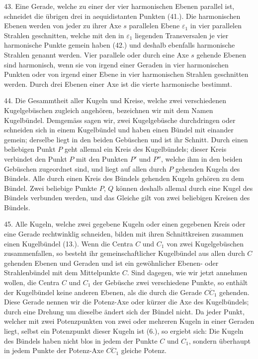 43. Eine Gerade, welche zu einer der vier harmonischen
Ebenen parallel ist, schneidet die \"ubrigen drei in aequidistanten
Punkten (41.). Die harmonischen Ebenen werden
von jeder zu ihrer Axe $s$ parallelen Ebene $\varepsilon_1$ in vier parallelen
Strahlen geschnitten, welche mit den in $\varepsilon_1$ liegenden
Transversalen je vier harmonische Punkte gemein haben (42.)
und deshalb ebenfalls harmonische Strahlen genannt werden.
Vier parallele oder durch eine Axe $s$ gehende Ebenen sind
harmonisch, wenn sie von irgend einer Geraden in vier harmonischen
Punkten oder von irgend einer Ebene in vier
harmonischen Strahlen geschnitten werden. Durch drei
Ebenen einer Axe ist die vierte harmonische bestimmt.

\begin{center}
\makebox[15em]{\hrulefill}
\end{center}


\label{p5}


\hspace{\parindent}%
44. Die Gesammtheit aller Kugeln und Kreise, welche
zwei verschiedenen Kugelgeb\"uschen zugleich angeh\"oren, bezeichnen
wir mit dem Namen {\glqq}Kugelb\"undel{\grqq}. Demgem\"ass
sagen wir, zwei Kugelgeb\"usche durchdringen oder schneiden
sich in einem Kugelb\"undel und haben einen B\"undel mit
einander gemein; derselbe liegt in den beiden Geb\"uschen
und ist ihr Schnitt. Durch einen beliebigen Punkt $P$ geht
allemal ein Kreis des Kugelb\"undels; dieser Kreis verbindet
den Punkt $P$ mit den Punkten $P'$ und $P''$, welche ihm in
den beiden Geb\"uschen zugeordnet sind, und liegt auf allen
durch $P$ gehenden Kugeln des B\"undels. Alle durch einen
Kreis des B\"undels gehenden Kugeln geh\"oren zu dem B\"undel.
Zwei beliebige Punkte $P$, $Q$ k\"onnen deshalb allemal durch
eine Kugel des B\"undels verbunden werden, und das Gleiche
gilt von zwei beliebigen Kreisen des B\"undels.

45. Alle Kugeln, welche zwei gegebene Kugeln oder
einen gegebenen Kreis oder eine Gerade rechtwinklig schneiden,
bilden mit ihren Schnittkreisen zusammen einen Kugelb\"undel
(13.). Wenn die Centra $C$ und $C_1$ von zwei Kugelgeb\"uschen
zusammenfallen, so besteht ihr gemeinschaftlicher
Kugelb\"undel aus allen durch $C$ gehenden Ebenen und Geraden
und ist ein gew\"ohnlicher Ebenen- oder Strahlenb\"undel
mit dem Mittelpunkte $C$. Sind dagegen, wie wir jetzt annehmen
wollen, die Centra $C$ und $C_1$ der Geb\"usche zwei
verschiedene Punkte, so enth\"alt der Kugelb\"undel keine anderen
Ebenen, als die durch die Gerade $\overline{CC_1}$ gehenden. Diese
Gerade nennen wir die {\glqq}Potenz-Axe{\grqq} oder k\"urzer die {\glqq}Axe
des Kugelb\"undels{\grqq}; durch eine Drehung um dieselbe \"andert
sich der B\"undel nicht. Da jeder Punkt, welcher mit zwei
Potenzpunkten von zwei oder mehreren Kugeln in einer Geraden
liegt, selbst ein Potenzpunkt dieser Kugeln ist (6.), so
ergiebt sich: Die Kugeln des B\"undels haben nicht blos in
jedem der Punkte $C$ und $C_1$, sondern \"uberhaupt in jedem
Punkte der Potenz-Axe $\overline{CC_1}$ gleiche Potenz.

